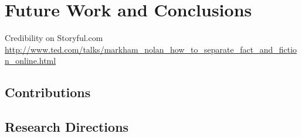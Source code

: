 

\chapter{Future Work and Conclusions}

\ifpdf
    \graphicspath{{11_future_work_and_conclusions/figures/PNG/}{11_future_work_and_conclusions/figures/PDF/}{11_future_work_and_conclusions/figures/}}
\else
    \graphicspath{{11_future_work_and_conclusions/figures/EPS/}{11_future_work_and_conclusions/figures/}}
\fi


Credibility on Storyful.com \url{http://www.ted.com/talks/markham_nolan_how_to_separate_fact_and_fiction_online.html}

\section{Contributions}

\section{Research Directions}





